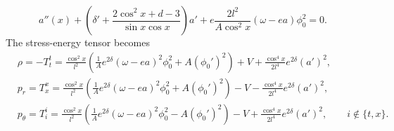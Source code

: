 \documentclass[a4paper,12pt]{article}
\begin{document}
\begin{equation}
	a''(x) + \left(\delta' + \frac{2\cos^2 x + d - 3}{\sin x \cos x}\right) a' + e\frac{2 l^2}{A\cos^2 x} (\omega - e a) \phi_0^2 = 0.
\end{equation}
The stress-energy tensor becomes
\begin{subequations}
\begin{align}
	&\rho = -T^t_t = \frac{\cos^2 x}{l^2}\left(\frac{1}{A}e^{2\delta}(\omega - e a)^2 \phi_0^2 + A(\phi_0')^2\right) + V + \frac{\cos^4 x}{2l^4} e^{2\delta} (a')^2,\\
	&p_r = T^x_x = \frac{\cos^2 x}{l^2}\left(\frac{1}{A}e^{2\delta}(\omega - e a)^2 \phi_0^2 + A(\phi_0')^2\right) - V - \frac{\cos^4 x}{2l^4} e^{2\delta} (a')^2,\\
	&p_\theta = T^i_i = \frac{\cos^2 x}{l^2}\left(\frac{1}{A}e^{2\delta}(\omega - e a)^2 \phi_0^2 - A(\phi_0')^2\right) - V + \frac{\cos^4 x}{2l^4} e^{2\delta} (a')^2,\qquad i \notin \{t, x\}.\\
\end{align}
\end{subequations}
\end{document}
